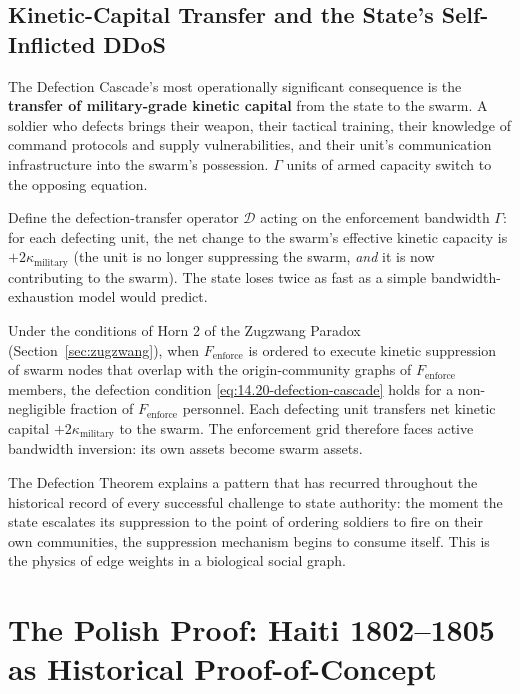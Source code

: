 \subsection{Kinetic-Capital Transfer and the State's Self-Inflicted DDoS}

The Defection Cascade's most operationally significant consequence is the \textbf{transfer of military-grade kinetic capital} from the state to the swarm. A soldier who defects brings their weapon, their tactical training, their knowledge of command protocols and supply vulnerabilities, and their unit's communication infrastructure into the swarm's possession. $\Gamma$ units of armed capacity switch to the opposing equation.

Define the defection-transfer operator $\mathcal{D}$ acting on the enforcement bandwidth $\Gamma$: for each defecting unit, the net change to the swarm's effective kinetic capacity is $+2\kappa_{\text{military}}$ (the unit is no longer suppressing the swarm, \textit{and} it is now contributing to the swarm). The state loses twice as fast as a simple bandwidth-exhaustion model would predict.

\begin{definition}\label{def:defection_theorem}
Under the conditions of Horn 2 of the Zugzwang Paradox (Section~\ref{sec:zugzwang}), when $F_{\text{enforce}}$ is ordered to execute kinetic suppression of swarm nodes that overlap with the origin-community graphs of $F_{\text{enforce}}$ members, the defection condition \eqref{eq:14.20-defection-cascade} holds for a non-negligible fraction of $F_{\text{enforce}}$ personnel. Each defecting unit transfers net kinetic capital $+2\kappa_{\text{military}}$ to the swarm. The enforcement grid therefore faces active bandwidth inversion: its own assets become swarm assets.
\end{definition}

The Defection Theorem explains a pattern that has recurred throughout the historical record of every successful challenge to state authority: the moment the state escalates its suppression to the point of ordering soldiers to fire on their own communities, the suppression mechanism begins to consume itself. This is the physics of edge weights in a biological social graph.

\section{The Polish Proof: Haiti 1802--1805 as Historical Proof-of-Concept}
\label{sec:polish_proof}

